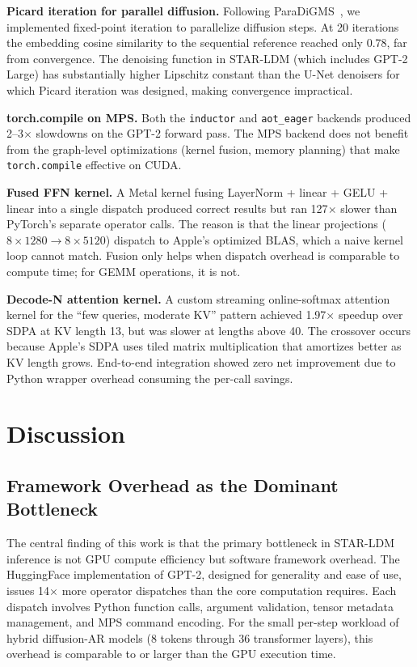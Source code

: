\documentclass[sigconf,authordraft]{acmart}
\begin{document}
\textbf{Picard iteration for parallel diffusion.} Following ParaDiGMS~\cite{shih2023paradigms}, we implemented fixed-point iteration to parallelize diffusion steps. At 20 iterations the embedding cosine similarity to the sequential reference reached only 0.78, far from convergence. The denoising function in STAR-LDM (which includes GPT-2 Large) has substantially higher Lipschitz constant than the U-Net denoisers for which Picard iteration was designed, making convergence impractical.

\textbf{torch.compile on MPS.} Both the \texttt{inductor} and \texttt{aot\_eager} backends produced 2--3$\times$ slowdowns on the GPT-2 forward pass. The MPS backend does not benefit from the graph-level optimizations (kernel fusion, memory planning) that make \texttt{torch.compile} effective on CUDA.

\textbf{Fused FFN kernel.} A Metal kernel fusing LayerNorm + linear + GELU + linear into a single dispatch produced correct results but ran 127$\times$ slower than PyTorch's separate operator calls. The reason is that the linear projections ($8 \times 1280 \to 8 \times 5120$) dispatch to Apple's optimized BLAS, which a naive kernel loop cannot match. Fusion only helps when dispatch overhead is comparable to compute time; for GEMM operations, it is not.

\textbf{Decode-N attention kernel.} A custom streaming online-softmax attention kernel for the ``few queries, moderate KV'' pattern achieved 1.97$\times$ speedup over SDPA at KV length 13, but was slower at lengths above 40. The crossover occurs because Apple's SDPA uses tiled matrix multiplication that amortizes better as KV length grows. End-to-end integration showed zero net improvement due to Python wrapper overhead consuming the per-call savings.

\section{Discussion}

\subsection{Framework Overhead as the Dominant Bottleneck}

The central finding of this work is that the primary bottleneck in STAR-LDM inference is not GPU compute efficiency but software framework overhead. The HuggingFace implementation of GPT-2, designed for generality and ease of use, issues 14$\times$ more operator dispatches than the core computation requires. Each dispatch involves Python function calls, argument validation, tensor metadata management, and MPS command encoding. For the small per-step workload of hybrid diffusion-AR models (8 tokens through 36 transformer layers), this overhead is comparable to or larger than the GPU execution time.
\end{document}
